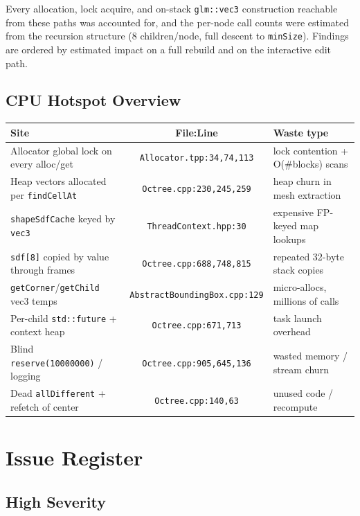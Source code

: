 \documentclass[a4paper,12pt]{article}
\begin{document}
Every allocation, lock acquire, and on-stack \texttt{glm::vec3} construction
reachable from these paths was accounted for, and the per-node call counts were
estimated from the recursion structure (8 children/node, full descent to
\texttt{minSize}). Findings are ordered by estimated impact on a full rebuild and
on the interactive edit path.

\subsection*{CPU Hotspot Overview}

\begin{center}
\begin{tabular}{lcl}
\toprule
\textbf{Site} & \textbf{File:Line} & \textbf{Waste type} \\
\midrule
Allocator global lock on every alloc/get      & \texttt{Allocator.tpp:34,74,113}     & lock contention + O(\#blocks) scans \\
Heap vectors allocated per \texttt{findCellAt} & \texttt{Octree.cpp:230,245,259}       & heap churn in mesh extraction \\
\texttt{shapeSdfCache} keyed by \texttt{vec3}  & \texttt{ThreadContext.hpp:30}          & expensive FP-keyed map lookups \\
\texttt{sdf[8]} copied by value through frames & \texttt{Octree.cpp:688,748,815}        & repeated 32-byte stack copies \\
\texttt{getCorner}/\texttt{getChild} vec3 temps & \texttt{AbstractBoundingBox.cpp:129}  & micro-allocs, millions of calls \\
Per-child \texttt{std::future} + context heap   & \texttt{Octree.cpp:671,713}            & task launch overhead \\
Blind \texttt{reserve(10000000)} / logging     & \texttt{Octree.cpp:905,645,136}        & wasted memory / stream churn \\
Dead \texttt{allDifferent} + refetch of center  & \texttt{Octree.cpp:140,63}             & unused code / recompute \\
\bottomrule
\end{tabular}
\end{center}

\newpage

\section{Issue Register}

\subsection{High Severity}
\end{document}
